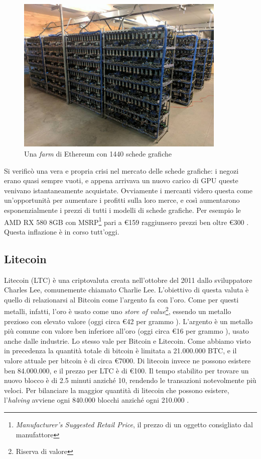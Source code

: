 \documentclass {article}
\begin{document}
\vspace {0.5cm}
\begin{figure}[htb!]
\includegraphics [width = 10cm] {ethfarm.jpeg}
\centering
\caption {Una \textit{farm} di Ethereum con 1440 schede grafiche}
\end{figure}
\vspace {0.2cm}
\noindent
%
Si verificò una vera e propria crisi nel mercato delle schede grafiche: i negozi erano quasi sempre vuoti, e appena arrivava un nuovo carico di GPU queste venivano istantaneamente acquistate.
Ovviamente i mercanti videro questa come un'opportunità per aumentare i profitti sulla loro merce, e così aumentarono esponenzialmente i prezzi di tutti i modelli di schede grafiche.
Per esempio le AMD RX 580 8GB con MSRP\footnote{\textit{Manufacturer's Suggested Retail Price}, il prezzo di un oggetto consigliato dal manufattore} pari a \euro{159} raggiunsero prezzi ben oltre \euro{300} \cite{ethboom}.
Questa inflazione è in corso tutt'oggi.


\subsection {Litecoin}


Litecoin (LTC) è una criptovaluta creata nell'ottobre del 2011 dallo sviluppatore Charles Lee, comunemente chiamato Charlie Lee. L'obiettivo di questa valuta è quello di relazionarsi al Bitcoin come l'argento fa con l'oro.
Come per questi metalli, infatti, l'oro è usato come uno \textit{store of value}\footnote{Riserva di valore}, essendo un metallo prezioso con elevato valore (oggi circa \euro{42} per grammo \cite{silverprice}). L'argento è un metallo più comune con valore ben inferiore all'oro (oggi circa \euro{16} per grammo \cite{goldprice}), usato anche dalle industrie.
Lo stesso vale per Bitcoin e Litecoin. Come abbiamo visto in precedenza la quantità totale di bitcoin è limitata a 21.000.000 BTC, e il valore attuale per bitcoin è di circa \euro{7000}.
Di litecoin invece ne possono esistere ben 84.000.000, e il prezzo per LTC è di \euro{100}.
Il tempo stabilito per trovare un nuovo blocco è di 2.5 minuti anziché 10, rendendo le transazioni notevolmente più veloci.
Per bilanciare la maggior quantità di litecoin che possono esistere, l'\textit{halving} avviene ogni 840.000 blocchi anziché ogni 210.000 \cite{ltcvsbtc}.
\end{document}
